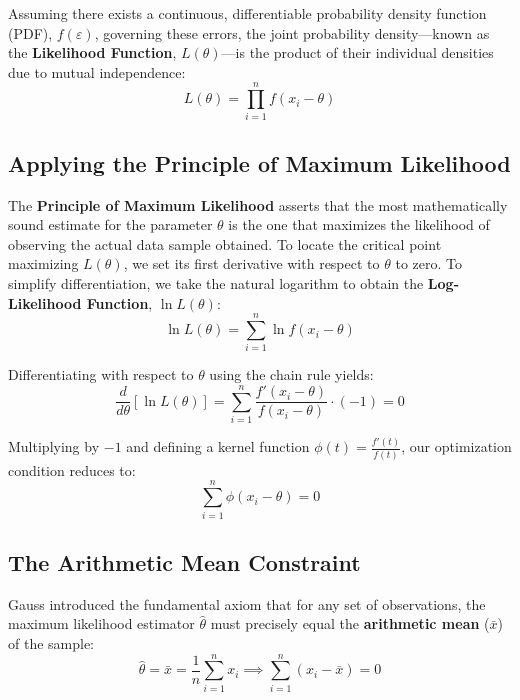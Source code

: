 \documentclass[11pt,a4paper]{article}
\begin{document}
Assuming there exists a continuous, differentiable probability density function (PDF), $f(\varepsilon)$, governing these errors, the joint probability density—known as the \textbf{Likelihood Function}, $L(\theta)$—is the product of their individual densities due to mutual independence:
\begin{equation}
L(\theta) = \prod_{i=1}^{n} f(x_i - \theta)
\end{equation}

\subsection{Applying the Principle of Maximum Likelihood}
The \textbf{Principle of Maximum Likelihood} asserts that the most mathematically sound estimate for the parameter $\theta$ is the one that maximizes the likelihood of observing the actual data sample obtained. To locate the critical point maximizing $L(\theta)$, we set its first derivative with respect to $\theta$ to zero. To simplify differentiation, we take the natural logarithm to obtain the \textbf{Log-Likelihood Function}, $\ln L(\theta)$:
\begin{equation}
\ln L(\theta) = \sum_{i=1}^{n} \ln f(x_i - \theta)
\end{equation}

Differentiating with respect to $\theta$ using the chain rule yields:
\begin{equation}
\frac{d}{d\theta}[\ln L(\theta)] = \sum_{i=1}^{n} \frac{f'(x_i - \theta)}{f(x_i - \theta)} \cdot (-1) = 0
\end{equation}

Multiplying by $-1$ and defining a kernel function $\phi(t) = \frac{f'(t)}{f(t)}$, our optimization condition reduces to:
\begin{equation}
\sum_{i=1}^{n} \phi(x_i - \theta) = 0
\end{equation}

\subsection{The Arithmetic Mean Constraint}
Gauss introduced the fundamental axiom that for any set of observations, the maximum likelihood estimator $\hat{\theta}$ must precisely equal the \textbf{arithmetic mean} ($\bar{x}$) of the sample:
\begin{equation}
\hat{\theta} = \bar{x} = \frac{1}{n}\sum_{i=1}^{n} x_i \implies \sum_{i=1}^{n} (x_i - \bar{x}) = 0
\end{equation}
\end{document}
